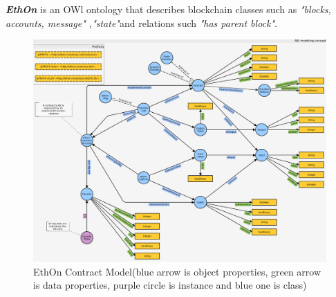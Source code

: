 \textbf{\textit{EthOn}} is an OWl ontology that describes blockchain classes such as \textit{"blocks, accounts, message" ,"state"}and relations such \textit{"has parent block"}\cite{Rashid}. 
\begin{center}
	
	\begin{figure}[htb!]
		
		\begin{minipage}{0.50\linewidth}
			\centering
			\includegraphics[width=1.80\textwidth]{images/chap2_EthOnContract.png}
		\end{minipage}
		\caption[EthOn classes]{EthOn Contract Model(blue arrow is object properties, green arrow is data properties, purple circle is instance and blue one is class)\cite{Rashid}}
		
	\end{figure}
	
	\begin{figure}[htb!]
		

\end{figure}
\end{center}
